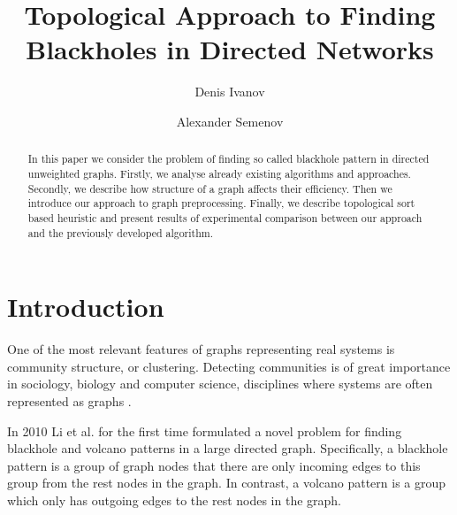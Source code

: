 \documentclass{svproc}
\begin{document}
\mainmatter              %
%
\title{Topological Approach to Finding Blackholes in Directed Networks}
%
%
\author{Denis Ivanov \and Alexander Semenov}
%
%
%

\maketitle              %

\begin{abstract}
In this paper we consider the problem of finding so called blackhole pattern in directed unweighted graphs.
Firstly, we analyse already existing algorithms and approaches. Secondly, we describe how structure of a graph
affects their efficiency. Then we introduce our approach to graph preprocessing. Finally, we describe topological sort based heuristic
and present results of experimental comparison between our approach and the previously developed algorithm.
\end{abstract}

\section{Introduction}

One of the most relevant features of graphs representing real systems is community
structure, or clustering. Detecting communities
is of great importance in sociology, biology and computer science, disciplines where systems are
often represented as graphs \cite{fortunato2010community}.

In 2010 Li et al.\cite{li2010detecting} for the first time formulated a novel problem for finding blackhole and volcano patterns in a large directed graph. Specifically, a blackhole pattern is a group of graph nodes 
that there are only incoming edges to this group from the rest nodes in the graph. In contrast, a volcano pattern is a
group which only has outgoing edges to the rest nodes in the graph. 
\end{document}

